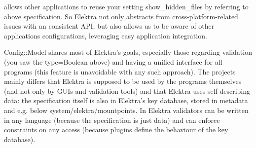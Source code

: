 allows other applications to reuse your setting show\+\_\+hidden\+\_\+files by referring to above specification. So Elektra not only abstracts from cross-\/platform-\/related issues with an consistent API, but also allows us to be aware of other applications\textquotesingle{} configurations, leveraging easy application integration.

Config\+::\+Model shares most of Elektra’s goals, especially those regarding validation (you saw the type=Boolean above) and having a unified interface for all programs (this feature is unavoidable with any such approach). The projects mainly differs that Elektra is supposed to be used by the programs themselves (and not only by GUIs and validation tools) and that Elektra uses self-\/describing data\+: the specification itself is also in Elektra’s key database, stored in metadata and e.\+g. below system/elektra/mountpoints. In Elektra validators can be written in any language (because the specification is just data) and can enforce constraints on any access (because plugins define the behaviour of the key database). 